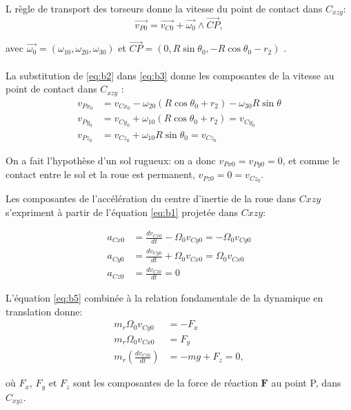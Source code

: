 L règle de transport des torseurs donne la vitesse du point de contact dans $C_{xzy}$:
\begin{equation}
    \vec{v_{P0}}=\vec{v_{C0}}+\vec{\omega_0} \wedge \vec{CP},
  \label{eq:b3}
\end{equation}

avec $\vec{\omega_0}=(\omega_{10},\omega_{20},\omega_{30})$
et $\vec{CP}=(0,R\sin{\theta_0},-R\cos{\theta_0}-r_2)$ . \\ \\

La substitution de \ref{eq:b2} dans \ref{eq:b3} donne les composantes de la vitesse au point de contact dans $C_{xzy}$ :
\begin{align}
    v_{Px_0}&=v_{Cx_0}-\omega_{20} (R\cos{\theta_0}+r_2) -\omega_{30} R\sin{\theta} \nonumber \\
    v_{Py_0}&=v_{Cy_0} + \omega_{10} (R\cos{\theta_0}+r_2)= v_{Cy_0} \nonumber\\
    v_{Pz_0}&=v_{Cz_0} + \omega_{10} R\sin{\theta_0} = v_{Cz_0}
  \label{eq:b4}
\end{align}

On a fait l'hypothèse d'un sol rugueux: on a donc $v_{Px0}=v_{Py0}=0$, et comme le contact entre le sol et la roue est permanent, $v_{Pz0}=0=v_{Cz_0}$.


Les composantes de l'accélération du centre d'inertie de la roue dans $C{xzy}$ s'expriment à partir de l'équation \ref{eq:b1} projetée dans $C{xzy}$:

\begin{align}
    a_{Cx0}&=\frac{dv_{Cx0}}{dt}-\Omega_0 v_{Cy0}=-\Omega_0 v_{Cy0} \nonumber\\
    a_{Cy0}&=\frac{dv_{Cy0}}{dt} + \Omega_0 v_{Cx0}=\Omega_0 v_{Cx0}\nonumber\\
    a_{Cz0}&=\frac{dv_{Cz0}}{dt} = 0
  \label{eq:b5}
\end{align}

L'équation \ref{eq:b5} combinée à la relation fondamentale de la dynamique en translation donne:
\begin{align}
    m_r\Omega_0 v_{Cy0}&=-F_x \nonumber\\
    m_r \Omega_0 v_{Cx0}&=F_y \nonumber\\
    m_r(\frac{dv_{Cz0}}{dt})&=-mg+F_z=0,
  \label{eq:b7}
\end{align}

où $F_x$, $F_y$ et $F_z$ sont les composantes de la force de réaction $\mathbf{F}$ au point P, dans $C_{xyz}$.

